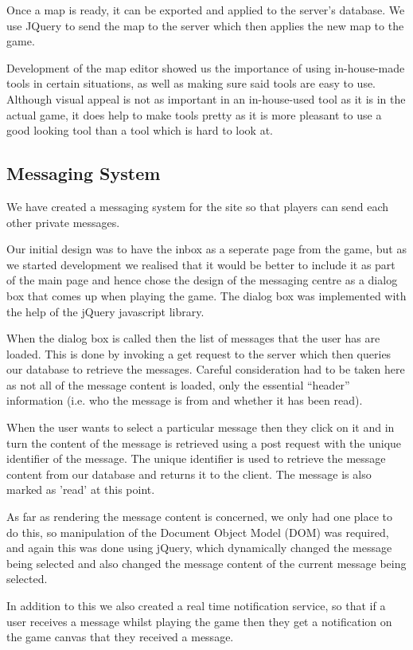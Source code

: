 \documentclass[a4paper,11pt]{article}
\begin{document}
		Once a map is ready, it can be exported and applied to the server's database. We use JQuery to send the map to the server which then applies the new map to the game.

		Development of the map editor showed us the importance of using in-house-made tools in certain situations, as well as making sure said tools are easy to use. Although visual appeal is not as important in an in-house-used tool as it is in the actual game, it does help to make tools pretty as it is more pleasant to use a good looking tool than a tool which is hard to look at.
		
		\subsection{Messaging System}
		We have created a messaging system for the site so that players can send each other private messages.

		Our initial design was to have the inbox as a seperate page from the game, but as we started development we realised that it would be better to include it as part of the main page and hence chose the design of the messaging centre as a dialog box that comes up when playing the game.
		The dialog box was implemented with the help of the jQuery javascript library.

		When the dialog box is called then the list of messages that the user has are loaded. This is done by invoking a get request to the server which then queries our database to retrieve the messages. Careful consideration had to be taken here as not all of the message content is loaded, only the essential ``header'' information (i.e. who the message is from and whether it has been read).

		When the user wants to select a particular message then they click on it and in turn the content of the message is retrieved using a post request with the unique identifier of the message. The unique identifier is used to retrieve the message content from our database and returns it to the client. The message is also marked as 'read' at this point.

		As far as rendering the message content is concerned, we only had one place to do this, so manipulation of the Document Object Model (DOM) was required, and again this was done using jQuery, which dynamically changed the message being selected and also changed the message content of the current message being selected.

		In addition to this we also created a real time notification service, so that if a user receives a message whilst playing the game then they get a notification on the game canvas that they received a message.
		
\end{document}
